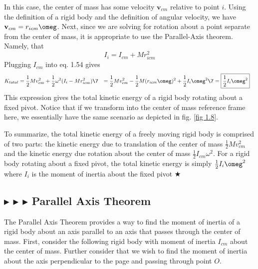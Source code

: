 \noindent In this case, the center of mass has some velocity $\mathbf{v}_{cm}$ relative to point $i$. Using the definition of a rigid body and the definition of angular velocity, we have $\mathbf{v}_{cm} = r_{icm} \omeg$. Next, since we are solving for rotation about a point separate from the center of mass, it is appropriate to use the Parallel-Axis theorem. Namely, that
\begin{equation}
    I_i = I_{cm} + Mr_{icm}^2
\end{equation}
\noindent Plugging $I_{cm}$ into eq. 1.54 gives
\begin{align}
    K_{total} &= \frac12 M v_{cm}^2 + \frac12 \omega^2 (I_i - Mr_{icm}^2) \7
    &= \frac12 M v_{cm}^2 - \frac12 M (r_{icm} \omeg)^2 + \frac12 I_i \omeg^2 \7
    &= \boxed{\frac12 I_i \omeg^2}
\end{align}
\noindent This expression gives the total kinetic energy of a rigid body rotating about a fixed pivot. Notice that if we transform into the center of mass reference frame here, we essentially have the same scenario as depicted in fig. \ref{fig 1.8}.

\noindent To summarize, the total kinetic energy of a freely moving rigid body is comprised of two parts: the kinetic energy due to translation of the center of mass $\frac12 M v_{cm}^2$ and the kinetic energy due rotation about the center of mass $\frac12 I_{cm} \omega^2$. For a rigid body rotating about a fixed pivot, the total kinetic energy is simply $\frac12 I_i \omeg^2$ where $I_i$ is the moment of inertia about the fixed pivot $\bigstar$

%
%
\subsection{\color{PineGreen} $\blacktriangleright$ \color{Goldenrod} $\blacktriangleright$ \color{Orchid} $\blacktriangleright$ \color{black} Parallel Axis Theorem}
The Parallel Axis Theorem provides a way to find the moment of inertia of a rigid body about an axis parallel to an axis that passes through the center of mass. First, consider the following rigid body with moment of inertia $I_{cm}$ about the center of mass. Further consider that we wish to find the moment of inertia about the axis perpendicular to the page and passing through point $O$.

